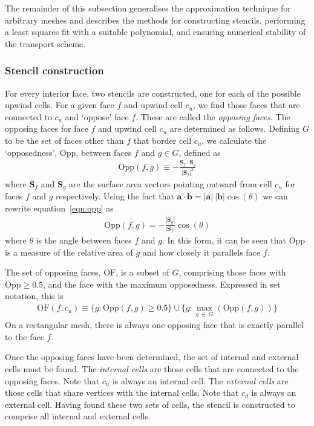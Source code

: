 The remainder of this subsection generalises the approximation technique for arbitrary meshes and describes the methods for constructing stencils, performing a least squares fit with a suitable polynomial, and ensuring numerical stability of the transport scheme.

\subsubsection{Stencil construction}
For every interior face, two stencils are constructed, one for each of the possible upwind cells.  For a given face $f$ and upwind cell $c_u$, we find those faces that are connected to $c_u$ and `oppose' face $f$.  These are called the \textit{opposing faces}.
The opposing faces for face $f$ and upwind cell $c_u$ are determined as follows.
Defining $G$ to be the set of faces other than $f$ that border cell $c_u$, we calculate the `opposedness', $\mathrm{Opp}$, between faces $f$ and $g \in G$, defined as
\begin{align}
	\mathrm{Opp}(f, g) \equiv - \frac{\mathbf{S}_f \cdot \mathbf{S}_g}{|\mathbf{S}_f|^2} \label{eqn:opp}
\end{align}
where $\mathbf{S}_f$ and $\mathbf{S}_g$ are the surface area vectors pointing outward from cell $c_u$ for faces $f$ and $g$ respectively.
Using the fact that $\mathbf{a} \cdot \mathbf{b} = |\mathbf{a}|\:|\mathbf{b}| \cos(\theta)$ we can rewrite equation~\eqref{eqn:opp} as
\begin{align}
	\mathrm{Opp}(f, g) = - \frac{|\mathbf{S}_g|}{|\mathbf{S}_f|} \cos(\theta)
\end{align}
where $\theta$ is the angle between faces $f$ and $g$.  In this form, it can be seen that $\mathrm{Opp}$ is a measure of the relative area of $g$ and how closely it parallels face $f$.

The set of opposing faces, $\mathrm{OF}$, is a subset of $G$, comprising those faces with $\mathrm{Opp} \geq 0.5$, and the face with the maximum opposedness.  Expressed in set notation, this is
\begin{align}
	\mathrm{OF}(f,c_u) \equiv \{ g : \mathrm{Opp}(f, g) \geq 0.5 \} \cup \{ g : \max_{g\:\in\:G}(\mathrm{Opp}(f, g)) \} 
\end{align}
On a rectangular mesh, there is always one opposing face that is exactly parallel to the face $f$.

Once the opposing faces have been determined, the set of internal and external cells must be found.  The \textit{internal cells} are those cells that are connected to the opposing faces.  Note that $c_u$ is always an internal cell.  The \textit{external cells} are those cells that share vertices with the internal cells.  Note that $c_d$ is always an external cell.  Having found these two sets of cells, the stencil is constructed to comprise all internal and external cells.

